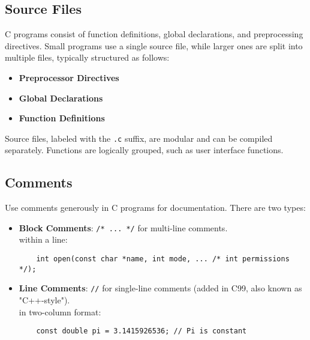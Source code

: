 \subsection{Source Files}
C programs consist of function definitions, global declarations, and preprocessing directives. Small programs use a single source file, while larger ones are split into multiple files, typically structured as follows:
\begin{itemize}
    \item \textbf{Preprocessor Directives}
    \item \textbf{Global Declarations}
    \item \textbf{Function Definitions}
\end{itemize}
Source files, labeled with the \texttt{.c} suffix, are modular and can be compiled separately. Functions are logically grouped, such as user interface functions.


\subsection{Comments}
Use comments generously in C programs for documentation. There are two types:
\begin{itemize}
    \item \textbf{Block Comments}: \texttt{/* ... */} for multi-line comments.\\
    within a line:
    \begin{tcolorbox}[]
    \begin{verbatim}
    int open(const char *name, int mode, ... /* int permissions */);
    \end{verbatim}
    \end{tcolorbox}
    \item \textbf{Line Comments}: \texttt{//} for single-line comments (added in C99, also known as "C++-style").\\
    in two-column format:
    \begin{tcolorbox}[]
    \begin{verbatim}
    const double pi = 3.1415926536; // Pi is constant
    \end{verbatim}
    \end{tcolorbox}
\end{itemize}

